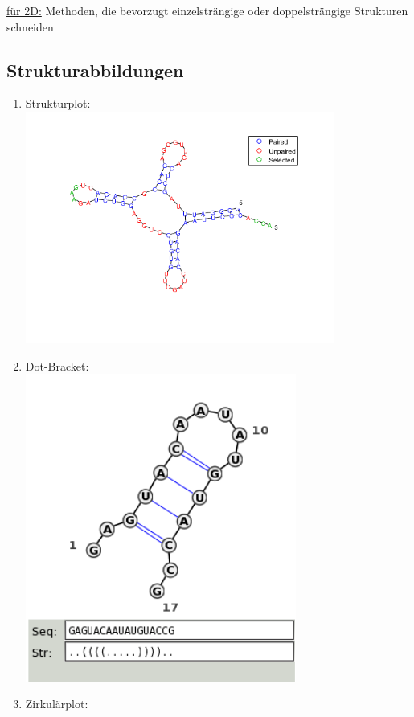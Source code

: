 \underline{für 2D:} Methoden, die bevorzugt einzelsträngige oder doppelsträngige Strukturen schneiden

\subsection{Strukturabbildungen}
\begin{enumerate}
	\item Strukturplot:\\
	\includegraphics[width=0.8\textwidth]{lectures/160404/pix/structure.png}
	\item Dot-Bracket:\\
	\includegraphics[width=0.7\textwidth]{lectures/160404/pix/dot_bracket.png}
	\item Zirkulärplot:\\

\end{enumerate}
